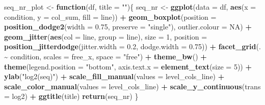 \documentclass[
  11pt,
]{article}
\newenvironment{Shaded}{\begin{snugshade}}{\end{snugshade}}
\newcommand{\AttributeTok}[1]{\textcolor[rgb]{0.13,0.29,0.53}{#1}}
\newcommand{\ConstantTok}[1]{\textcolor[rgb]{0.56,0.35,0.01}{#1}}
\newcommand{\ControlFlowTok}[1]{\textcolor[rgb]{0.13,0.29,0.53}{\textbf{#1}}}
\newcommand{\DecValTok}[1]{\textcolor[rgb]{0.00,0.00,0.81}{#1}}
\newcommand{\FloatTok}[1]{\textcolor[rgb]{0.00,0.00,0.81}{#1}}
\newcommand{\FunctionTok}[1]{\textcolor[rgb]{0.13,0.29,0.53}{\textbf{#1}}}
\newcommand{\NormalTok}[1]{#1}
\newcommand{\OtherTok}[1]{\textcolor[rgb]{0.56,0.35,0.01}{#1}}
\newcommand{\SpecialCharTok}[1]{\textcolor[rgb]{0.81,0.36,0.00}{\textbf{#1}}}
\newcommand{\StringTok}[1]{\textcolor[rgb]{0.31,0.60,0.02}{#1}}
\begin{document}
\begin{Shaded}
\begin{Highlighting}[]
\NormalTok{seq\_nr\_plot }\OtherTok{\textless{}{-}} \ControlFlowTok{function}\NormalTok{(df, }\AttributeTok{title =} \StringTok{""}\NormalTok{)\{}
\NormalTok{  seq\_nr }\OtherTok{\textless{}{-}} \FunctionTok{ggplot}\NormalTok{(}\AttributeTok{data =}\NormalTok{ df, }\FunctionTok{aes}\NormalTok{(}\AttributeTok{x =}\NormalTok{ condition, }\AttributeTok{y =}\NormalTok{ col\_sum, }\AttributeTok{fill =}\NormalTok{ line)) }\SpecialCharTok{+} 
              \FunctionTok{geom\_boxplot}\NormalTok{(}\AttributeTok{position =} \FunctionTok{position\_dodge2}\NormalTok{(}\AttributeTok{width =} \FloatTok{0.75}\NormalTok{, }\AttributeTok{preserve =} \StringTok{"single"}\NormalTok{), }\AttributeTok{outlier.colour =} \ConstantTok{NA}\NormalTok{) }\SpecialCharTok{+}
              \FunctionTok{geom\_jitter}\NormalTok{(}\FunctionTok{aes}\NormalTok{(}\AttributeTok{col =}\NormalTok{ line, }\AttributeTok{group =}\NormalTok{ line), }\AttributeTok{size =} \DecValTok{1}\NormalTok{, }\AttributeTok{position =} \FunctionTok{position\_jitterdodge}\NormalTok{(}\AttributeTok{jitter.width =} \FloatTok{0.2}\NormalTok{, }\AttributeTok{dodge.width =} \FloatTok{0.75}\NormalTok{)) }\SpecialCharTok{+}
              \FunctionTok{facet\_grid}\NormalTok{(. }\SpecialCharTok{\textasciitilde{}}\NormalTok{ condition, }\AttributeTok{scales =} \StringTok{\textquotesingle{}free\_x\textquotesingle{}}\NormalTok{, }\AttributeTok{space =} \StringTok{"free"}\NormalTok{) }\SpecialCharTok{+}
              \FunctionTok{theme\_bw}\NormalTok{() }\SpecialCharTok{+}
              \FunctionTok{theme}\NormalTok{(}\AttributeTok{legend.position =} \StringTok{"bottom"}\NormalTok{, }\AttributeTok{axis.text.x =} \FunctionTok{element\_text}\NormalTok{(}\AttributeTok{size =} \DecValTok{5}\NormalTok{)) }\SpecialCharTok{+}
              \FunctionTok{ylab}\NormalTok{(}\StringTok{"log2(seq)"}\NormalTok{) }\SpecialCharTok{+}
              \FunctionTok{scale\_fill\_manual}\NormalTok{(}\AttributeTok{values =}\NormalTok{ level\_cols\_line) }\SpecialCharTok{+}
              \FunctionTok{scale\_color\_manual}\NormalTok{(}\AttributeTok{values =}\NormalTok{ level\_cols\_line) }\SpecialCharTok{+}
              \FunctionTok{scale\_y\_continuous}\NormalTok{(}\AttributeTok{trans =} \StringTok{\textquotesingle{}log2\textquotesingle{}}\NormalTok{) }\SpecialCharTok{+}
              \FunctionTok{ggtitle}\NormalTok{(title)}
  \FunctionTok{return}\NormalTok{(seq\_nr)}
\NormalTok{\}}


\end{Highlighting}
\end{Shaded}
\end{document}
